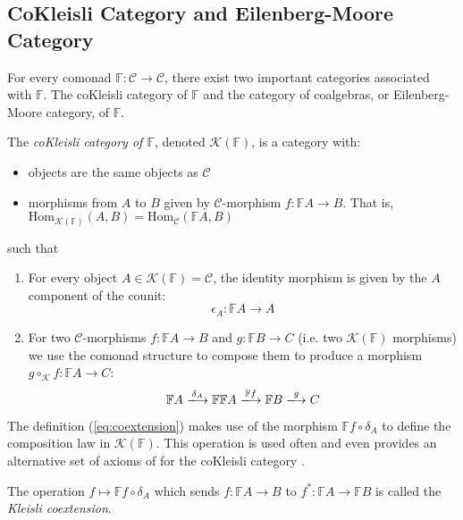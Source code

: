 \subsection{CoKleisli Category and Eilenberg-Moore Category}
For every comonad $\mathbb{F}:\mathcal{C} \longrightarrow \mathcal{C}$, there exist two important categories associated with $\mathbb{F}$. The coKleisli category of $\mathbb{F}$ and the category of coalgebras, or Eilenberg-Moore category, of $\mathbb{F}$. 
\begin{defn}
The \textit{coKleisli category of $\mathbb{F}$}, denoted $\mathcal{K}(\mathbb{F})$, is a category with:
\begin{itemize}
    \item objects are the same objects as $\mathcal{C}$
    \item morphisms from $A$ to $B$ given by $\mathcal{C}$-morphism $f:\mathbb{F}A \longrightarrow B$. That is, $\text{Hom}_{\mathcal{K}(\mathbb{F})}(A,B) = \text{Hom}_{\mathcal{C}}(\mathbb{F}A,B)$
\end{itemize}
such that 
\begin{enumerate}[label=(\arabic*)]
    \item For every object $A \in \mathcal{K}(\mathbb{F}) = \mathcal{C}$, the identity morphism is given by the $A$ component of the counit:  
    \begin{equation}
        \epsilon_{A}:\mathbb{F}A \longrightarrow A
    \end{equation}
    \item For two $\mathcal{C}$-morphisms $f:\mathbb{F}A \longrightarrow B$ and $g:\mathbb{F}B \longrightarrow C$ (i.e. two $\mathcal{K}(\mathbb{F})$ morphisms) we use the comonad structure to compose them to produce a morphism $g \circ_{\mathcal{K}} f:\mathbb{F}A \longrightarrow C$:
    \begin{equation} 
        \mathbb{F}A \xlongrightarrow{\delta_{A}} \mathbb{F}\mathbb{F}A \xlongrightarrow{\mathbb{F}f} \mathbb{F}B \xlongrightarrow{g} C 
    \label{eq:coextension}
    \end{equation}
\end{enumerate}
\end{defn}
The definition (\ref{eq:coextension}) makes use of the morphism $\mathbb{F}f \circ \delta_{A}$ to define the composition law in $\mathcal{K}(\mathbb{F})$. This operation is used often and even provides an alternative set of axioms of for the coKleisli category \cite{Moggi1991}. 
\begin{defn}
The operation $f \mapsto \mathbb{F}f \circ \delta_{A}$ which sends $f:\mathbb{F}A \longrightarrow B$ to $f^{*}: \mathbb{F}A \longrightarrow \mathbb{F}B$ is called the \textit{Kleisli coextension}. 
\end{defn}
